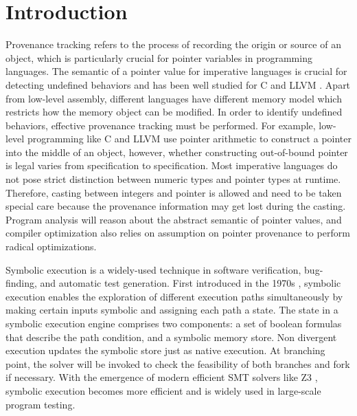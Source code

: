 \documentclass[sigplan, nonacm]{acmart}\settopmatter{printfolios=true,printccs=false,printacmref=false}
\begin{document}

\maketitle

\section{Introduction}
Provenance tracking refers to the process of recording the origin or source of an object, which is particularly crucial for pointer variables in programming languages. The semantic of a pointer value for imperative languages is crucial for detecting undefined behaviors and has been well studied for C \cite{memarian2016into, memarian2019exploring} and LLVM \cite{lee2018reconciling}. Apart from low-level assembly, different languages have different memory model which restricts how the memory object can be modified. In order to identify undefined behaviors, effective provenance tracking must be performed. For example, low-level programming like C and LLVM use pointer arithmetic to construct a pointer into the middle of an object, however, whether constructing out-of-bound pointer is legal varies from specification to specification. Most imperative languages do not pose strict distinction between numeric types and pointer types at runtime. Therefore, casting between integers and pointer is allowed and need to be taken special care because the provenance information may get lost during the casting. Program analysis will reason about the abstract semantic of pointer values, and compiler optimization also relies on assumption on pointer provenance to perform radical optimizations.\par
Symbolic execution is a widely-used technique in software verification, bug-finding, and automatic test generation. First introduced in the 1970s \cite{boyer1975select, howden1977symbolic, king1975new, king1976symbolic}, symbolic execution enables the exploration of different execution paths simultaneously by making certain inputs symbolic and assigning each path a state. The state in a symbolic execution engine comprises two components: a set of boolean formulas that describe the path condition, and a symbolic memory store. Non divergent execution updates the symbolic store just as native execution. At branching point, the solver will be invoked to check the feasibility of both branches and fork if necessary. With the emergence of modern efficient SMT \cite{barrett2021satisfiability} solvers like Z3 \cite{moura2008z3}, symbolic execution becomes more efficient and is widely used in large-scale program testing.\par
\end{document}
